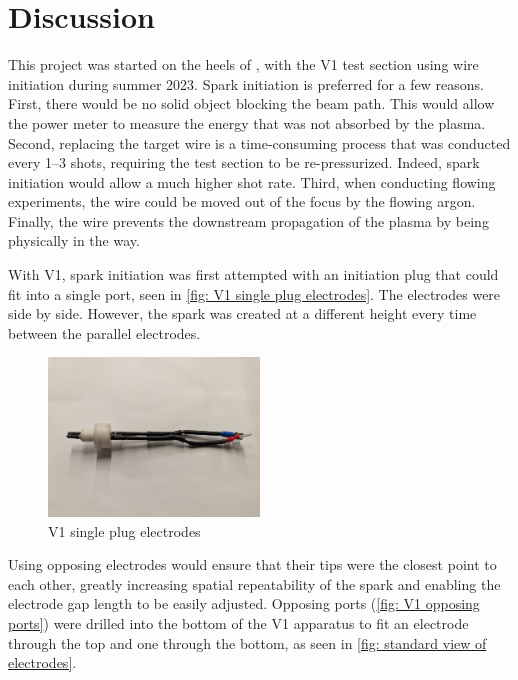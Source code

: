 \chapter{Discussion}

This project was started on the heels of \textcite{duplayArgonLaserPlasmaThruster2024a}, with the V1 test section using wire initiation during summer 2023. Spark initiation is preferred for a few reasons. First, there would be no solid object blocking the beam path. This would allow the power meter to measure the energy that was not absorbed by the plasma. Second, replacing the target wire is a time-consuming process that was conducted every 1–3 shots, requiring the test section to be re-pressurized. Indeed, spark initiation would allow a much higher shot rate. Third, when conducting flowing experiments, the wire could be moved out of the focus by the flowing argon. Finally, the wire prevents the downstream propagation of the plasma by being physically in the way.

With V1, spark initiation was first attempted with an initiation plug that could fit into a single port, seen in \autoref{fig: V1 single plug electrodes}. The electrodes were side by side. However, the spark was created at a different height every time between the parallel electrodes.

\begin{figure}[!ht]
    \centering
    \includegraphics[width=0.5\textwidth]{assets/5 discussion/V1 single plug electrode.jpg}
    \caption{V1 single plug electrodes}
    \label{fig: V1 single plug electrodes}
\end{figure}

Using opposing electrodes would ensure that their tips were the closest point to each other, greatly increasing spatial repeatability of the spark and enabling the electrode gap length to be easily adjusted. Opposing ports (\autoref{fig: V1 opposing ports}) were drilled into the bottom of the V1 apparatus to fit an electrode through the top and one through the bottom, as seen in \autoref{fig: standard view of electrodes}.


